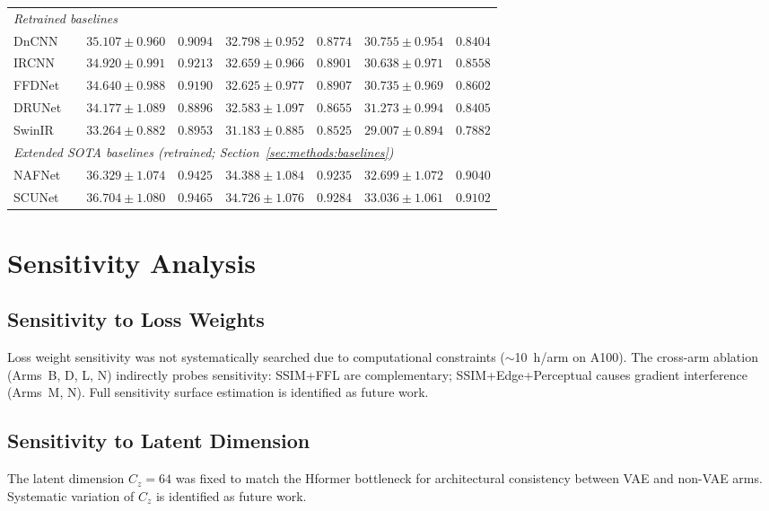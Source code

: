 \documentclass[12pt, a4paper, twoside, openright]{book}
\begin{document}
\begin{landscape}
\begin{longtable}{llcccccc}
\midrule
\multicolumn{8}{l}{\textit{Retrained baselines}} \\
DnCNN  & \cite{zhang_beyond_2017}  & $35.107 \pm 0.960$ & $0.9094$ & $32.798 \pm 0.952$ & $0.8774$ & $30.755 \pm 0.954$ & $0.8404$ \\
IRCNN  & \cite{zhang_learning_2017}& $34.920 \pm 0.991$ & $0.9213$ & $32.659 \pm 0.966$ & $0.8901$ & $30.638 \pm 0.971$ & $0.8558$ \\
FFDNet & \cite{zhang_ffdnet_2018}  & $34.640 \pm 0.988$ & $0.9190$ & $32.625 \pm 0.977$ & $0.8907$ & $30.735 \pm 0.969$ & $0.8602$ \\
DRUNet & \cite{zhang_drunet_2021}  & $34.177 \pm 1.089$ & $0.8896$ & $32.583 \pm 1.097$ & $0.8655$ & $31.273 \pm 0.994$ & $0.8405$ \\
SwinIR & \cite{liang_swinir_2021}  & $33.264 \pm 0.882$ & $0.8953$ & $31.183 \pm 0.885$ & $0.8525$ & $29.007 \pm 0.894$ & $0.7882$ \\
\midrule
\multicolumn{8}{l}{\textit{Extended SOTA baselines (retrained; Section~\ref{sec:methods:baselines})}} \\
NAFNet & \cite{chen_nafnet_2022}  & $36.329 \pm 1.074$ & $0.9425$ & $34.388 \pm 1.084$ & $0.9235$ & $32.699 \pm 1.072$ & $0.9040$ \\
SCUNet & \cite{zhang_scunet_2023} & $\mathbf{36.704 \pm 1.080}$ & $\mathbf{0.9465}$ & $\mathbf{34.726 \pm 1.076}$ & $\mathbf{0.9284}$ & $\mathbf{33.036 \pm 1.061}$ & $\mathbf{0.9102}$ \\
%
\end{longtable}
\end{landscape}

\section{Sensitivity Analysis}
\label{sec:results:sensitivity}

\subsection{Sensitivity to Loss Weights}
\label{sec:results:sensitivity:weights}
Loss weight sensitivity was not systematically searched due to computational constraints ($\sim$10~h/arm on A100). The cross-arm ablation (Arms~B, D, L, N) indirectly probes sensitivity: SSIM+FFL are complementary; SSIM+Edge+Perceptual causes gradient interference (Arms~M, N). Full sensitivity surface estimation is identified as future work.

\subsection{Sensitivity to Latent Dimension}
\label{sec:results:sensitivity:latent}
The latent dimension $C_z=64$ was fixed to match the Hformer bottleneck for architectural consistency between VAE and non-VAE arms. Systematic variation of $C_z$ is identified as future work.
\end{document}
